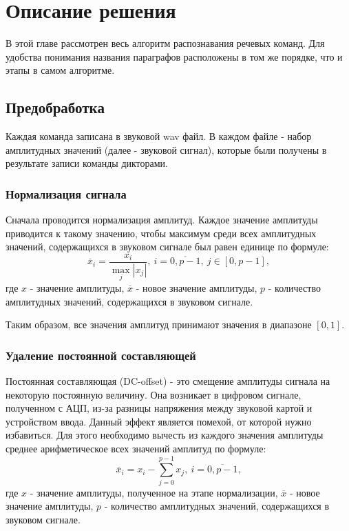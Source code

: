 \section{Описание решения}
В этой главе рассмотрен весь алгоритм распознавания речевых команд. Для удобства понимания названия параграфов расположены в том же порядке, что и этапы в самом алгоритме.

\subsection{Предобработка}
Каждая команда записана в звуковой wav файл. В каждом файле - набор амплитудных значений (далее - звуковой сигнал), которые были получены в результате записи команды дикторами. 

\subsubsection{Нормализация сигнала}
Сначала проводится нормализация амплитуд. Каждое значение амплитуды приводится к такому значению, чтобы максимум среди всех амплитудных значений, содержащихся в звуковом сигнале был равен единице по формуле:
\begin{equation}
	\overline{x}_i=\dfrac{x_i}{\max_{j} |x_j|},~i=\overline{0, p-1},~j \in [0, p-1],
\end{equation}
где $x$ - значение амплитуды, $\overline{x}$ - новое значение амплитуды, $p$ - количество амплитудных значений, содержащихся в звуковом сигнале.

Таким образом, все значения амплитуд принимают значения в диапазоне $[0,1]$.

\subsubsection{Удаление постоянной составляющей}
Постоянная составляющая (DC-offset) - это смещение амплитуды сигнала на некоторую постоянную величину. Она возникает в цифровом сигнале, полученном с АЦП,  из-за разницы напряжения между звуковой картой и устройством ввода. Данный эффект является помехой, от которой нужно избавиться. Для этого необходимо вычесть из каждого значения амплитуды среднее арифметическое всех значений амплитуд по формуле:
\begin{equation}
\overline{x}_i=x_i - \sum_{j=0}^{p-1} x_j,~i=\overline{0, p-1},
\end{equation}
где $x$ - значение амплитуды, полученное на этапе нормализации, $\overline{x}$ - новое значение амплитуды, $p$ - количество амплитудных значений, содержащихся в звуковом сигнале.


